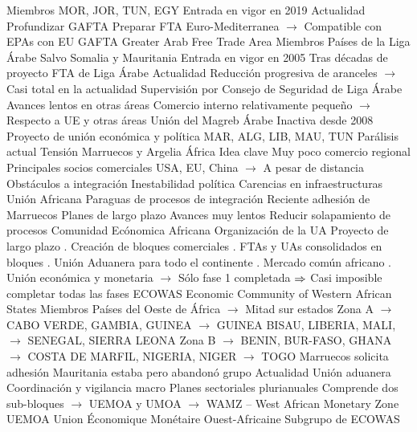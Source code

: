 \documentclass{nuevotema}
\begin{document}
\begin{esquemal}
				\4 Miembros
				\4[] MOR, JOR, TUN, EGY
				\4 Entrada en vigor en 2019
				\4 Actualidad
				\4[] Profundizar GAFTA
				\4[] Preparar FTA Euro-Mediterranea
				\4[] $\to$ Compatible con EPAs con EU
			\3 GAFTA
				\4 Greater Arab Free Trade Area
				\4 Miembros
				\4[] Países de la Liga Árabe
				\4[] Salvo Somalia y Mauritania
				\4 Entrada en vigor en 2005
				\4[] Tras décadas de proyecto
				\4[] FTA de Liga Árabe
				\4 Actualidad
				\4[] Reducción progresiva de aranceles
				\4[] $\to$ Casi total en la actualidad
				\4[] Supervisión por Consejo de Seguridad de Liga Árabe
				\4[] Avances lentos en otras áreas
				\4[] Comercio interno relativamente pequeño
				\4[] $\to$ Respecto a UE y otras áreas
			\3 Unión del Magreb Árabe
				\4 Inactiva desde 2008
				\4 Proyecto de unión económica y política
				\4[] MAR, ALG, LIB, MAU, TUN
				\4 Parálisis actual
				\4[] Tensión Marruecos y Argelia
		\2 África
			\3 Idea clave
				\4 Muy poco comercio regional
				\4 Principales socios comerciales
				\4[] USA, EU, China
				\4[] $\to$ A pesar de distancia
				\4 Obstáculos a integración
				\4[] Inestabilidad política
				\4[] Carencias en infraestructuras
			\3 Unión Africana
				\4 Paraguas de procesos de integración
				\4 Reciente adhesión de Marruecos
				\4 Planes de largo plazo
				\4[] Avances muy lentos
				\4[] Reducir solapamiento de procesos
			\3 Comunidad Ecónomica Africana
				\4 Organización de la UA
				\4 Proyecto de largo plazo
				. Creación de bloques comerciales
				. FTAs y UAs consolidados en bloques
				. Unión Aduanera para todo el continente
				. Mercado común africano
				. Unión económica y monetaria
				\4[] $\to$ Sólo fase 1 completada
				\4[] $\Rightarrow$ Casi imposible completar todas las fases
			\3 ECOWAS
				\4 Economic Community of Western African States
				\4 Miembros
				\4[] Países del Oeste de África
				\4[] $\to$ Mitad sur
				\4[] 15 estados
				\4[] Zona A
				\4[] $\to$ CABO VERDE, GAMBIA, GUINEA
				\4[] $\to$ GUINEA BISAU, LIBERIA, MALI,
				\4[] $\to$ SENEGAL, SIERRA LEONA
				\4[] Zona B
				\4[] $\to$ BENIN, BUR-FASO, GHANA
				\4[] $\to$ COSTA DE MARFIL, NIGERIA, NIGER
				\4[] $\to$ TOGO
				\4[] Marruecos solicita adhesión
				\4[] Mauritania estaba pero abandonó grupo
				\4 Actualidad
				\4[] Unión aduanera
				\4[] Coordinación y vigilancia macro
				\4[] Planes sectoriales plurianuales
				\4[] Comprende dos sub-bloques
				\4[] $\to$ UEMOA y UMOA
				\4[] $\to$ WAMZ -- West African Monetary Zone
			\3 UEMOA
				\4 Union Économique Monétaire Ouest-Africaine
				\4 Subgrupo de ECOWAS

\end{esquemal}
\end{document}
